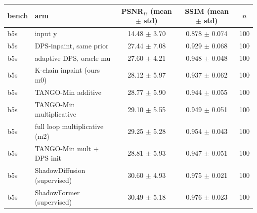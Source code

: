 \begin{tabular}{llccc}
\toprule
bench & arm & PSNR$_\Omega$ (mean $\pm$ std) & SSIM (mean $\pm$ std) & $n$\\
\midrule
b5s & input y & 14.48 $\pm$ 3.70 & 0.878 $\pm$ 0.074 & 100\\
b5s & DPS-inpaint, same prior & 27.44 $\pm$ 7.08 & 0.929 $\pm$ 0.068 & 100\\
b5s & adaptive DPS, oracle mu & 27.60 $\pm$ 4.21 & 0.948 $\pm$ 0.048 & 100\\
b5s & K-chain inpaint (ours m0) & 28.12 $\pm$ 5.97 & 0.937 $\pm$ 0.062 & 100\\
b5s & TANGO-Min additive & 28.77 $\pm$ 5.90 & 0.944 $\pm$ 0.055 & 100\\
b5s & TANGO-Min multiplicative & 29.10 $\pm$ 5.55 & 0.949 $\pm$ 0.051 & 100\\
b5s & full loop multiplicative (m2) & 29.25 $\pm$ 5.28 & 0.954 $\pm$ 0.043 & 100\\
b5s & TANGO-Min mult + DPS init & 28.81 $\pm$ 5.93 & 0.947 $\pm$ 0.051 & 100\\
b5s & ShadowDiffusion (supervised) & 30.60 $\pm$ 4.93 & 0.975 $\pm$ 0.021 & 100\\
b5s & ShadowFormer (supervised) & 30.49 $\pm$ 5.18 & 0.976 $\pm$ 0.023 & 100\\
\bottomrule
\end{tabular}
